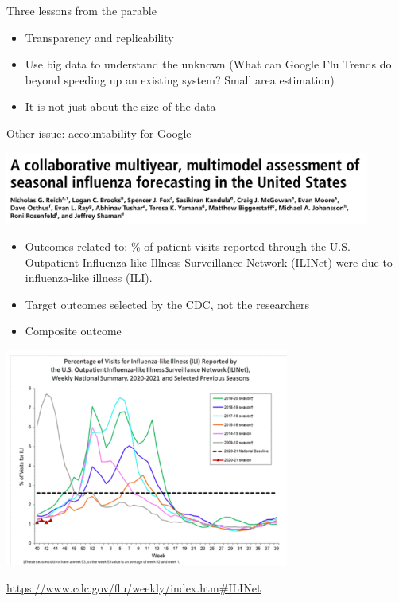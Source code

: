 \documentclass[aspectratio=169]{beamer}
\begin{document}
\begin{frame}

Three lessons from the parable
\begin{itemize}
\item Transparency and replicability
\pause
\item Use big data to understand the unknown (What can Google Flu Trends do beyond speeding up an existing system? Small area estimation)
\pause
\item It is not just about the size of the data
\end{itemize}
\pause
\vfill
Other issue: accountability for Google 

\end{frame}
\begin{frame}

\begin{center}
\includegraphics[width = 0.9\textwidth]{figures/reich_collaborative_2019_title}
\end{center}

\end{frame}
\begin{frame}

\begin{itemize}
\item Outcomes related to: \% of patient visits reported through the U.S. Outpatient Influenza-like Illness Surveillance Network (ILINet) were due to influenza-like illness (ILI). 
\pause
\item Target outcomes selected by the CDC, not the researchers
\pause
\item Composite outcome
\end{itemize}

\end{frame}
\begin{frame}

\begin{center}
\includegraphics[width = 0.7\textwidth]{figures/ilinet_week43}
\end{center}

\vfill
\url{https://www.cdc.gov/flu/weekly/index.htm\#ILINet}

\end{frame}
\end{document}
